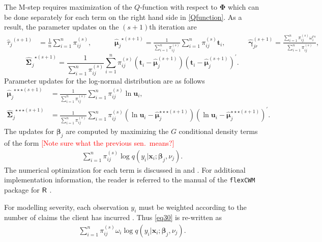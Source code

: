 \documentclass[12pt,letterpaper]{article}
\numberwithin{equation}{section}
\numberwithin{equation}{section}
\numberwithin{equation}{section}
\begin{document}
The M-step requires maximization of the $Q$-function with respect to $\bm \Phi$ which can be done separately for each term on the right hand side in \eqref{Qfunction}. %
As a result, the parameter updates on the $(s+1)$th iteration are
\begin{align*}
{\hat{\tau}_j}^{(s+1)}&=\frac{1}{n} \sum_{i=1}^n \pi_{ij}^{(s)}, && && {\hat{\bm{\mu}}_j}^{\star (s+1)}=\frac{1}{\sum_{i=1}^n \pi_{ij}^{(s)}} \sum_{i=1}^n \pi_{ij}^{(s)}\bm t_i, &&  && {\hat{\bm \gamma}^{(s+1)}_{jr}} =\frac{\sum_{i=1}^n \pi_{ij}^{(s)} \omega^{rs}_i} {\sum_{i=1}^n \pi_{ij}^{(s)}},
\end{align*}
$$
 {\widehat{\bm \Sigma^{}}_j}^{\star(s+1)}=\frac{1}{\sum_{i=1}^n \pi_{ij}^{(s)}} \sum_{i=1}^n \pi_{ij}^{(s)}(\bm t_i-\hat{\bm \mu}^{(s+1)}_j) (\bm t_i-\hat{\bm \mu}^{(s+1)}_j)^{'}.
$$
Parameter updates for the log-normal distribution are as follows
\begin{equation*}\begin{split}
{\hat{\bm \mu}_j}^{\star\star\star (s+1)}&=\frac{1}{\sum_{i=1}^n \pi_{ij}^{(s)}} \sum_{i=1}^n \pi_{ij}^{(s)}\ln \bm u_i,\\
{\widehat{\bm \Sigma}_j}^{\star\star\star(s+1)}&=\frac{1}{\sum_{i=1}^n \pi_{ij}^{(s)}} \sum_{i=1}^n \pi_{ij}^{(s)}(\ln \bm u_i-\hat{\bm \mu}^{\star\star\star(s+1)}_j) (\ln \bm u_i-\hat{\bm \mu}^{\star\star\star(s+1)}_j)^{'}. 
\end{split}\end{equation*}
The updates for $\bm{\beta}_j$ are computed by maximizing the $G$ conditional density terms of the form  \textcolor{red}{[Note sure what the previous sen.\ means?]}
\begin{align}
\sum_{i=1}^{n}\pi^{(s)}_{ij} \log{q}(y_i|\bm x_i;\bm \beta_j,\nu_j).
\label{eq30}
\end{align}
The numerical optimization for each term is discussed in \cite{Wedel+DeSabro:1995} and \cite{Wedel:2002}.
For additional implementation information, the reader is referred to the manual of the {\tt flexCWM} package \citep{Ingrassia+Punzo+Vittadini+Minotti:2015} for ${\sf R}$ \citep{R18}.

For modelling severity, each observation $y_i$ must be weighted according to the number of claims the client has incurred \citep[see pages 118-119][]{frees2015}. Thus \eqref{eq30} is re-written as 
\begin{align}
\sum_{i=1}^{n}\pi^{(s)}_{ij} \mathcal{\omega}_i \log{q}(y_i|\bm x_i;\bm \beta_j,\nu_j).
\label{eqFrees}
\end{align}
\end{document}
